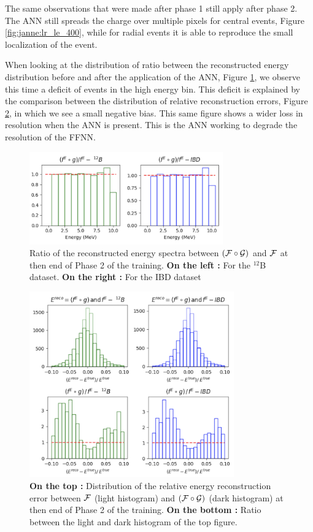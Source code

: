 \documentclass[../main.tex]{subfiles}
\begin{document}
The same observations that were made after phase 1 still apply after phase 2. The ANN still spreads the charge over multiple pixels for central events, Figure \ref{fig:janne:lr_le_400}, while for radial events it is able to reproduce the small localization of the event.

When looking at the distribution of ratio between the reconstructed energy distribution before and after the application of the ANN, Figure \ref{fig:janne:f_circ_over_f_400}, we observe this time a deficit of events in the high energy bin. This deficit is explained by the comparison between the distribution of relative reconstruction errors, Figure \ref{fig:janne:rec_err_400}, in which we see a small negative bias. This same figure shows a wider loss in resolution when the ANN is present. This is the ANN working to degrade the resolution of the FFNN.

\begin{figure}[!ht]
  \centering
  \includegraphics[height=4cm]{images/janne/f_circ_over_f_400.png}
  \caption{Ratio of the reconstructed energy spectra between $({\cal F} \circ {\cal G})$ and ${\cal F}$ at then end of Phase 2 of the training. \textbf{On the left :} For the $^{12}$B dataset. \textbf{On the right :} For the IBD dataset}
  \label{fig:janne:f_circ_over_f_400}
\end{figure}

\begin{figure}[!ht]
  \centering
  \includegraphics[height=8cm]{images/janne/rec_err_400.png}
  \caption{\textbf{On the top :} Distribution of the relative energy reconstruction error between ${\cal F}$ (light histogram) and $({\cal F} \circ {\cal G})$ (dark histogram) at then end of Phase 2 of the training. \textbf{On the bottom :} Ratio between the light and dark histogram of the top figure.}
  \label{fig:janne:rec_err_400}
\end{figure}
\end{document}
